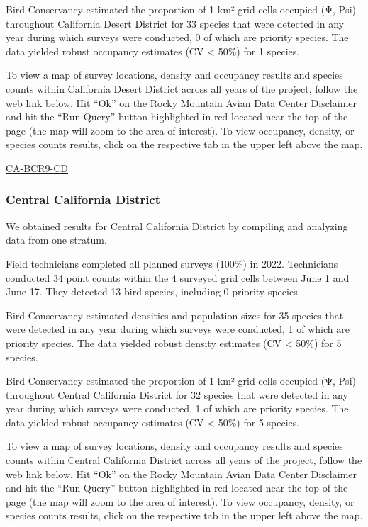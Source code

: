 \documentclass[
  letterpaper,
  DIV=11,
  numbers=noendperiod,
  oneside]{scrreprt}
\begin{document}
Bird Conservancy estimated the proportion of 1 km² grid cells occupied
(Ψ, Psi) throughout California Desert District for 33 species that were
detected in any year during which surveys were conducted, 0 of which are
priority species. The data yielded robust occupancy estimates (CV
\textless{} 50\%) for 1 species.

To view a map of survey locations, density and occupancy results and
species counts within California Desert District across all years of the
project, follow the web link below. Hit ``Ok'' on the Rocky Mountain
Avian Data Center Disclaimer and hit the ``Run Query'' button
highlighted in red located near the top of the page (the map will zoom
to the area of interest). To view occupancy, density, or species counts
results, click on the respective tab in the upper left above the map.

\href{http://www.rmbo.org/new_site/adc/QueryWindow.aspx\#N4IgzgLgTghhCuBbEAuABCAwgQQLQCFMAlATl0wBF194oBTGeNAewDM0AZGAOwBM0AsjxgBzOojrcIaXGkwwANgEtWzKNyUw0FOmDpRpFJZChKAxhBABfIA=}{CA-BCR9-CD}

\hypertarget{central-california-district}{%
\subsubsection{Central California
District}\label{central-california-district}}

We obtained results for Central California District by compiling and
analyzing data from one stratum.

Field technicians completed all planned surveys (100\%) in 2022.
Technicians conducted 34 point counts within the 4 surveyed grid cells
between June 1 and June 17. They detected 13 bird species, including 0
priority species.

Bird Conservancy estimated densities and population sizes for 35 species
that were detected in any year during which surveys were conducted, 1 of
which are priority species. The data yielded robust density estimates
(CV \textless{} 50\%) for 5 species.

Bird Conservancy estimated the proportion of 1 km² grid cells occupied
(Ψ, Psi) throughout Central California District for 32 species that were
detected in any year during which surveys were conducted, 1 of which are
priority species. The data yielded robust occupancy estimates (CV
\textless{} 50\%) for 5 species.

To view a map of survey locations, density and occupancy results and
species counts within Central California District across all years of
the project, follow the web link below. Hit ``Ok'' on the Rocky Mountain
Avian Data Center Disclaimer and hit the ``Run Query'' button
highlighted in red located near the top of the page (the map will zoom
to the area of interest). To view occupancy, density, or species counts
results, click on the respective tab in the upper left above the map.
\end{document}
